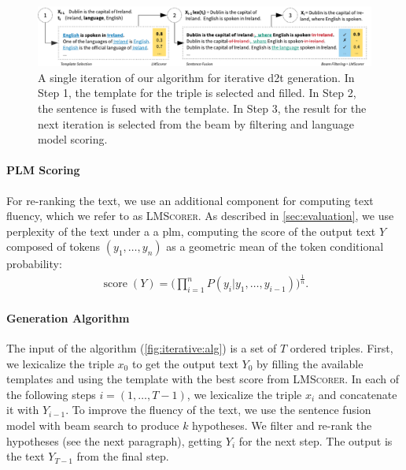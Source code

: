 \begin{figure}[t]
    \centering
    \includegraphics[width=\textwidth]{img/d2t_text_editing}
    \caption{A single iteration of our algorithm for iterative \ac{d2t} generation. In Step 1, the template for the triple is selected and filled. In Step 2, the sentence is fused with the template. In Step 3, the result for the next iteration is selected from the beam by filtering and language model scoring.}\label{fig:iterative:alg}
\end{figure}



\paragraph{PLM Scoring} For re-ranking the text, we use an additional component for computing text fluency, which we refer to as \textsc{LMScorer}.
As described in \autoref{sec:evaluation}, we use perplexity of the text under a a \ac{plm}, computing the score of the output text $Y$ composed of tokens $(y_1, \ldots, y_n)$ as a geometric mean of the token conditional probability:
\begin{align}
    \operatorname{score}(Y) = \Bigg( \prod_{i=1}^{n}{P(y_i|y_1, \ldots, y_{i-1})} \Bigg)^{\frac{1}{n}}.
\end{align}




\paragraph{Generation Algorithm}
The input of the algorithm (\autoref{fig:iterative:alg}) is a set of $T$ ordered triples. First, we lexicalize the triple $x_0$ to get the output text $Y_0$ by filling the available templates and using the template with the best score from \textsc{LMScorer}.
In each of the following steps $i=(1, \ldots, T-1)$, we lexicalize the triple $x_i$ and concatenate it with $Y_{i-1}$.  To improve the fluency of the text, we use the sentence fusion model with beam search to produce $k$ hypotheses. We filter and re-rank the hypotheses (see the next paragraph), getting $Y_{i}$ for the next step. The output is the text $Y_{T-1}$ from the final step.


